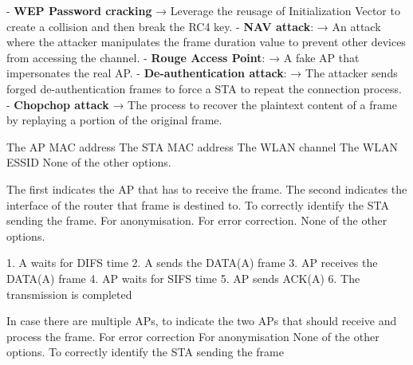 \begin{questions}
    - \textbf{WEP Password cracking} → Leverage the reusage of Initialization Vector to create a collision and then break the RC4 key.
    - \textbf{NAV attack}: → An attack where the attacker manipulates the frame duration value to prevent other devices from accessing the channel.
    - \textbf{Rouge Access Point}: → A fake AP that impersonates the real AP.
    - \textbf{De-authentication attack}: → The attacker sends forged de-authentication frames to force a STA to repeat the connection process.
    - \textbf{Chopchop attack} → The process to recover the plaintext content of a frame by replaying a portion of the original frame.


    \begin{checkboxes}
        \CorrectChoice The AP MAC address
        \CorrectChoice The STA MAC address
        \CorrectChoice The WLAN channel
        \choice The WLAN ESSID
        \choice None of the other options.
    \end{checkboxes}



    \begin{checkboxes}
        \CorrectChoice The first indicates the AP that has to receive the frame. The second indicates the interface of the router that frame is destined to.
        \choice To correctly identify the STA sending the frame.
        \choice For anonymisation.
        \choice For error correction.
        \choice None of the other options.
    \end{checkboxes}

    1. A waits for DIFS time
    2. A sends the DATA(A) frame
    3. AP receives the DATA(A) frame
    4. AP waits for SIFS time
    5. AP sends ACK(A)
    6. The transmission is completed

    \begin{checkboxes}
        \choice In case there are multiple APs, to indicate the two APs that should receive and process the frame.
        \choice For error correction
        \choice For anonymisation
        \CorrectChoice None of the other options.
        \choice To correctly identify the STA sending the frame
    \end{checkboxes}


\end{questions}

